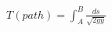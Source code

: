 \documentclass[preview]{standalone}
\begin{document}
\begin{align*}
T(path) = \int_{A}^{B} \frac{ds}{\sqrt{2gy}}
\end{align*}
\end{document}
